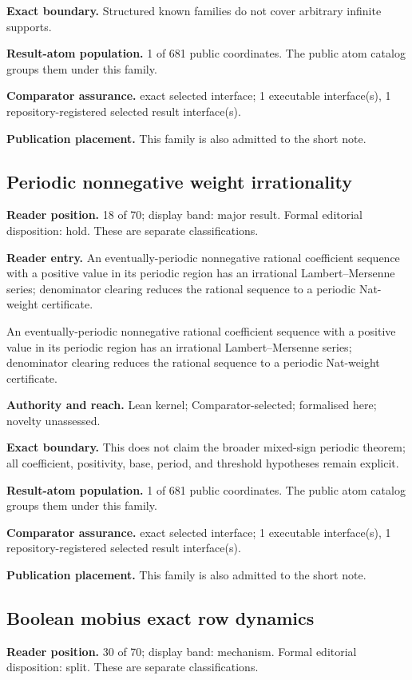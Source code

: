 \textbf{Exact boundary.} Structured known families do not cover arbitrary infinite supports.

\textbf{Result-atom population.} 1 of 681 public coordinates. The public atom catalog groups them under this family.

\textbf{Comparator assurance.} exact selected interface; 1 executable interface(s), 1 repository-registered selected result interface(s).

\textbf{Publication placement.} This family is also admitted to the short note.

\subsection{Periodic nonnegative weight irrationality}
\textbf{Reader position.} 18 of 70; display band: major result.  Formal editorial disposition: hold.  These are separate classifications.

\textbf{Reader entry.} An eventually-periodic nonnegative rational coefficient sequence with a positive value in its periodic region has an irrational Lambert–Mersenne series; denominator clearing reduces the rational sequence to a periodic Nat-weight certificate.

An eventually-periodic nonnegative rational coefficient sequence with a positive value in its periodic region has an irrational Lambert–Mersenne series; denominator clearing reduces the rational sequence to a periodic Nat-weight certificate.

\textbf{Authority and reach.} Lean kernel; Comparator-selected; formalised here; novelty unassessed.

\textbf{Exact boundary.} This does not claim the broader mixed-sign periodic theorem; all coefficient, positivity, base, period, and threshold hypotheses remain explicit.

\textbf{Result-atom population.} 1 of 681 public coordinates. The public atom catalog groups them under this family.

\textbf{Comparator assurance.} exact selected interface; 1 executable interface(s), 1 repository-registered selected result interface(s).

\textbf{Publication placement.} This family is also admitted to the short note.

\subsection{Boolean mobius exact row dynamics}
\textbf{Reader position.} 30 of 70; display band: mechanism.  Formal editorial disposition: split.  These are separate classifications.

